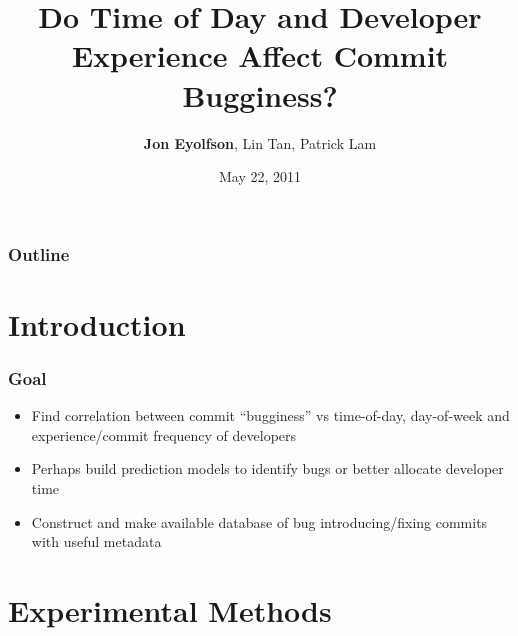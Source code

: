 \documentclass[aspectratio=43]{beamer}
\title{Do Time of Day and Developer Experience Affect Commit Bugginess?}
\author{{\bfseries Jon Eyolfson}, Lin Tan, Patrick Lam}
\institute{University of Waterloo}
\date{May 22, 2011}
\begin{document}
\begin{frame}[plain]
\titlepage
\end{frame}

\begin{frame}
  \frametitle{Outline}
  \setcounter{tocdepth}{1}
  \tableofcontents
\end{frame}

\section{Introduction}
\begin{frame}
  \frametitle{Goal}
  
  \begin{itemize}

    \item Find correlation between commit ``bugginess'' vs time-of-day,
          day-of-week and experience/commit frequency of developers

    \vspace{2em}

    \item Perhaps build prediction models to identify bugs or better allocate
          developer time

    \vspace{2em}

    \item Construct and make available database of bug introducing/fixing
          commits with useful metadata

  \end{itemize}
\end{frame}

\section{Experimental Methods}
\end{document}
